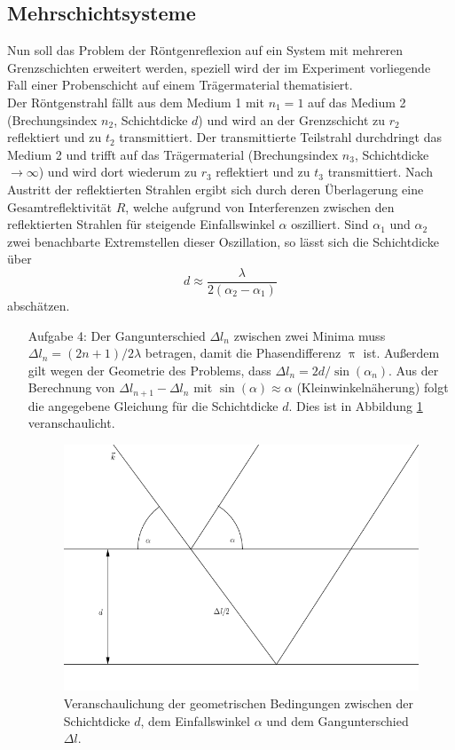 \subsection{Mehrschichtsysteme}
Nun soll das Problem der Röntgenreflexion auf ein System mit mehreren 
Grenzschichten erweitert werden, speziell wird der im Experiment vorliegende 
Fall einer Probenschicht auf einem Trägermaterial thematisiert.\\
Der Röntgenstrahl fällt aus dem Medium 1 mit $n_1=1$ auf das Medium 
2 (Brechungsindex $n_2$, Schichtdicke $d$) und wird an der Grenzschicht zu $r_2$ 
reflektiert und zu $t_2$ 
transmittiert. Der transmittierte Teilstrahl durchdringt das Medium 2 und trifft 
auf das Trägermaterial (Brechungsindex $n_3$, Schichtdicke $\to \infty$) und wird 
dort wiederum zu $r_3$ reflektiert und zu $t_3$ transmittiert. Nach Austritt der 
reflektierten Strahlen ergibt sich durch deren Überlagerung eine 
Gesamtreflektivität $R$, welche aufgrund von Interferenzen zwischen den 
reflektierten Strahlen für steigende Einfallswinkel $\alpha$ oszilliert. Sind 
$\alpha_1$ und $\alpha_2$ zwei benachbarte Extremstellen dieser Oszillation, so 
lässt sich die Schichtdicke über
\begin{equation}
d \approx \frac{\lambda}{2(\alpha_2 -\alpha_1)}
\end{equation}
abschätzen.
\begin{itemize}
\item[Aufgabe 4:]
Der Gangunterschied $\Delta l_n$ zwischen zwei Minima muss $\Delta l_n=
(2n+1)/2 \lambda$ betragen, damit die Phasendifferenz $\uppi$ ist. Außerdem 
gilt wegen der Geometrie des Problems, dass $\Delta l_n = 2 d/\sin(\alpha_n)$. 
Aus der Berechnung von $\Delta l_{n+1}- \Delta l_n$ mit $\sin(\alpha)\approx 
\alpha$ (Kleinwinkelnäherung) folgt die angegebene Gleichung für die 
Schichtdicke $d$. Dies ist in Abbildung \ref{fig:Bild} veranschaulicht.
\begin{figure}[h]
\centering
\includegraphics[scale=0.4]{../skript/Bild.png}
\caption{Veranschaulichung der geometrischen Bedingungen zwischen der 
Schichtdicke $d$, dem Einfallswinkel $\alpha$ und dem Gangunterschied $\Delta 
l$.}
\label{fig:Bild}
\end{figure}
\end{itemize}
